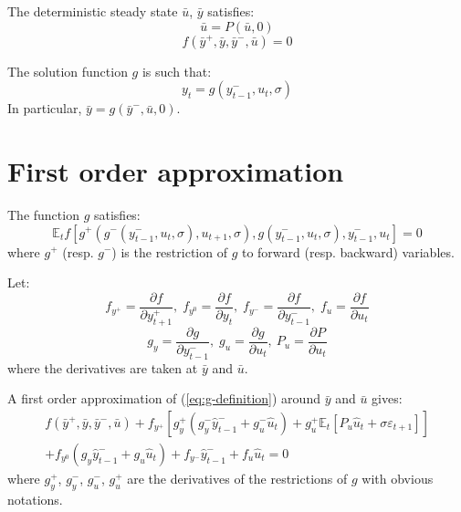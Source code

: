 \documentclass[11pt,a4paper]{article}
\begin{document}
The deterministic steady state $\bar{u}$, $\bar{y}$ satisfies:
\begin{equation*}
  \bar{u} = P(\bar{u}, 0)
\end{equation*}
\begin{equation*}
  f(\bar{y}^+, \bar{y}, \bar{y}^-, \bar{u}) = 0
\end{equation*}

The solution function $g$ is such that:
\begin{equation*}
  y_t = g(y^-_{t-1}, u_t, \sigma)
\end{equation*}
In particular, $\bar{y} = g(\bar{y}^-, \bar{u}, 0)$.

\section{First order approximation}

The function $g$ satisfies:
\begin{equation}
  \label{eq:g-definition}
  \mathbb{E}_t f\left[g^+(g^-(y^-_{t-1}, u_t,\sigma), u_{t+1}, \sigma), g(y^-_{t-1}, u_t, \sigma), y^-_{t-1}, u_t\right] = 0
\end{equation}
where $g^+$ (resp. $g^-$) is the restriction of $g$ to forward (resp. backward) variables.

Let:
\begin{equation*}
  f_{y^+} = \frac{\partial f}{\partial y^+_{t+1}}, \; f_{y^0} = \frac{\partial f}{\partial y_t}, \;  f_{y^-} = \frac{\partial f}{\partial y^-_{t-1}}, \;
  f_u   = \frac{\partial f}{\partial u_t}
\end{equation*}
\begin{equation*}
  g_y = \frac{\partial g}{\partial y^-_{t-1}},\;
  g_u = \frac{\partial g}{\partial u_t}, \:
  P_u = \frac{\partial P}{\partial u_t}
\end{equation*}
where the derivatives are taken at $\bar{y}$ and $\bar{u}$.

A first order approximation of (\ref{eq:g-definition}) around $\bar{y}$ and $\bar{u}$ gives:
\begin{multline*}
  f(\bar{y}^+, \bar{y}, \bar{y}^-, \bar{u}) + f_{y^+} [g^+_y(g^-_y \hat{y}^-_{t-1} + g^-_u \hat{u}_t) + g^+_u \mathbb{E}_t [P_u \hat{u}_t + \sigma \varepsilon_{t+1}] ] \\ + f_{y^0} (g_y \hat{y}^-_{t-1} + g_u \hat{u}_t) + f_{y^-}\hat{y}^-_{t-1} + f_u \hat{u}_t = 0
\end{multline*}
where $g^+_y$, $g^-_y$, $g^-_u$, $g^+_u$ are the derivatives of the restrictions of $g$ with obvious notations.
\end{document}
